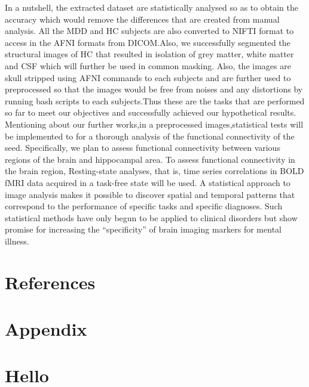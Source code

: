 \documentclass{article}
\begin{document}
In a nutshell, the extracted dataset are statistically analysed so as
to obtain the accuracy which would remove the differences that are
created from manual analysis. All the MDD and HC subjects are also
converted to NIFTI format to access in the AFNI formats from
DICOM.Also, we successfully segmented the structural images of HC that
resulted in isolation of grey matter, white matter and CSF which will
further be used in common masking. Also, the images are skull
stripped using AFNI commands to each subjects and are further used to
preprocessed so that the images would be free from noises and any
distortions by running bash scripts to each subjects.Thus these are
the tasks that are performed so far to meet our objectives and
successfully achieved our hypothetical results. Mentioning about our
further works,in a preprocessed images,statistical tests will be
implemented to for a thorough analysis of the functional connectivity
of the seed. Specifically, we plan to assess functional connectivity
between various regions of the brain and hippocampal area. To assess
functional connectivity in the brain region, Resting-state analyses,
that is, time series correlations in BOLD fMRI data acquired in a
task-free state will be used. A statistical approach to image analysis
makes it possible to discover spatial and temporal patterns that
correspond to the performance of specific tasks and specific
diagnoses. Such statistical methods have only begun to be applied to
clinical disorders but show promise for increasing the ``specificity''
of brain imaging markers for mental illness.

\section*{References}
\printbibliography[heading=none]

\section*{Appendix}

\appendix

\section{Hello}



\endgroup %
\end{document}
